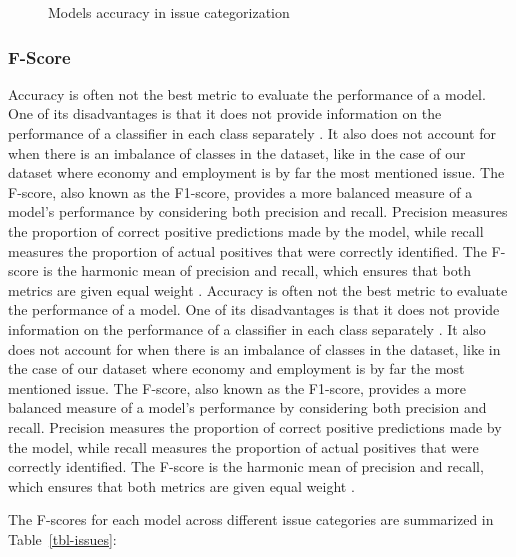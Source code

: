 \documentclass[
  authoryear,
  preprint,
  3p]{elsarticle}
\begin{document}
\begin{figure}


\caption{\label{fig-accuracy}Models accuracy in issue categorization}

\end{figure}%

\subsubsection{F-Score}\label{f-score}

Accuracy is often not the best metric to evaluate the performance of a
model. One of its disadvantages is that it does not provide information
on the performance of a classifier in each class separately
\citep{obi23}. It also does not account for when there is an imbalance
of classes in the dataset, like in the case of our dataset where economy
and employment is by far the most mentioned issue. The F-score, also
known as the F1-score, provides a more balanced measure of a model's
performance by considering both precision and recall. Precision measures
the proportion of correct positive predictions made by the model, while
recall measures the proportion of actual positives that were correctly
identified. The F-score is the harmonic mean of precision and recall,
which ensures that both metrics are given equal weight
\citep{christen_etal24}. Accuracy is often not the best metric to
evaluate the performance of a model. One of its disadvantages is that it
does not provide information on the performance of a classifier in each
class separately \citep{obi23}. It also does not account for when there
is an imbalance of classes in the dataset, like in the case of our
dataset where economy and employment is by far the most mentioned issue.
The F-score, also known as the F1-score, provides a more balanced
measure of a model's performance by considering both precision and
recall. Precision measures the proportion of correct positive
predictions made by the model, while recall measures the proportion of
actual positives that were correctly identified. The F-score is the
harmonic mean of precision and recall, which ensures that both metrics
are given equal weight \citep{christen_etal24}.

The F-scores for each model across different issue categories are
summarized in Table~\ref{tbl-issues}:
\end{document}
